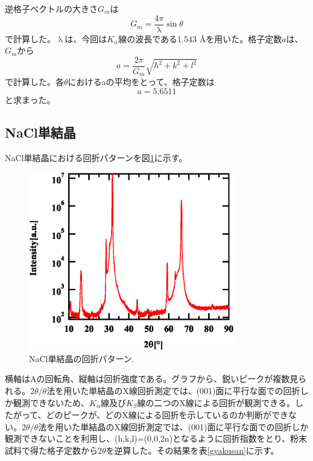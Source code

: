 \documentclass[11pt,a4j,uplatex]{jsarticle}
\begin{document}
\newpage
逆格子ベクトルの大きさ$G_{m}$は
\begin{equation}
 G_m=\frac{4\pi}{\uplambda}\sin\theta
 \label{gyakukousi}
\end{equation}
で計算した。$\uplambda$は、今回は$K_\alpha$線の波長である1.543 \AA を用いた。格子定数$a$は、$G_{m}$から
\begin{equation}
 a=\frac{2\pi}{G_m}\sqrt{h^2+k^2+l^2}
 \label{kousiteisuu}
\end{equation}
で計算した。各$\theta$におけるaの平均をとって、格子定数は
\begin{equation}
 \nonumber
 a=5.6511
 \label{complete}
\end{equation}
と求まった。

\newpage
\subsection{NaCl単結晶}



NaCl単結晶における回折パターンを図\ref{bulk}に示す。

\begin{figure}[htb]
 \centering
 \includegraphics[clip,width=9cm]{FigBulk.eps}
 \caption{NaCl単結晶の回折パターン.}
 \label{bulk}
\end{figure}

横軸はAの回転角、縦軸は回折強度である。グラフから、鋭いピークが複数見られる。$2\theta/\theta$法を用いた単結晶のX線回折測定では、(001)面に平行な面での回折しか観測できないため、$K_\alpha$線及び$K_\beta$線の二つのX線による回折が観測できる。したがって、どのピークが、どのX線による回折を示しているのか判断ができない。$2\theta/\theta$法を用いた単結晶のX線回折測定では、(001)面に平行な面での回折しか観測できないことを利用し、(h,k,l)=(0,0,2n)となるように回折指数をとり、粉末試料で得た格子定数から$2\theta$を逆算した。その結果を表\ref{gyakusan}に示す。
\end{document}
